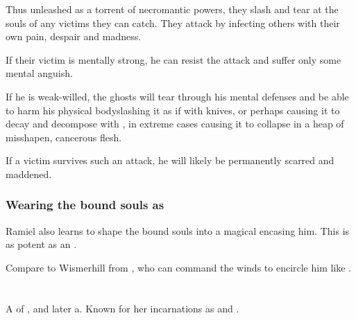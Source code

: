 Thus unleashed as a torrent of necromantic powers, they slash and tear at the souls of any victims they can catch. They attack by infecting others with their own pain, despair and madness.

If their victim is mentally strong, he can resist the attack and suffer only some mental anguish. 

If he is weak-willed, the ghosts will tear through his mental defenses and be able to harm his physical body\dash slashing it as if with knives, or perhaps causing it to decay and decompose with , in extreme cases causing it to collapse in a heap of misshapen, cancerous flesh. 

If a victim survives such an attack, he will likely be permanently scarred and maddened. 






\subsubsection{Wearing the bound souls as \armour}
Ramiel also learns to shape the bound souls into a magical \armour encasing him. This is as potent as an .

Compare to Wismerhill from \FLuneNoire, who can command the winds to encircle him like \armour. 















\section[Shiaraid]{\Shiaraid}
\index{\Shiaraid}
A \sathariah{} \resvil{} of \Mystraacht, and later a\malach{}. 
Known for her incarnations as  and .








